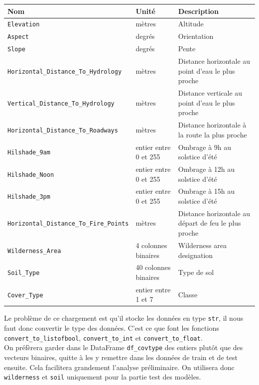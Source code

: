 \documentclass[12pt,a4paper]{article}
\numberwithin{equation}{section}
\newcommand{\elevation}{\texttt{Elevation}}
\newcommand{\aspect}{\texttt{Aspect}}
\newcommand{\slope}{\texttt{Slope}}
\newcommand{\hhydro}{\texttt{Horizontal\_Distance\_To\_Hydrology}}
\newcommand{\vhydro}{\texttt{Vertical\_Distance\_To\_Hydrology}}
\newcommand{\roadways}{\texttt{Horizontal\_Distance\_To\_Roadways}}
\newcommand{\hilshadeM}{\texttt{Hilshade\_9am}}
\newcommand{\hilshadeN}{\texttt{Hilshade\_Noon}}
\newcommand{\hilshadeA}{\texttt{Hilshade\_3pm}}
\newcommand{\wilderness}{\texttt{Wilderness\_Area}}
\newcommand{\soil}{\texttt{Soil\_Type}}
\newcommand{\cover}{\texttt{Cover\_Type}}
\begin{document}
	\begin{flushleft}
		\begin{tabular}{l l p{5.2cm}}
			Nom & Unité & Description \\
			\hline
			\elevation & mètres & Altitude \\ 
			\aspect & degrés & Orientation \\ 
			\slope & degrés & Pente \\
			\hhydro & mètres & Distance horizontale au point d’eau le plus proche\\
			\vhydro & mètres & Distance verticale au point d’eau le plus proche \\
			\roadways & mètres & Distance horizontale à la route la plus proche \\
			\hilshadeM & entier entre 0 et 255 & Ombrage à 9h au solstice d’été \\
			\hilshadeN & entier entre 0 et 255 & Ombrage à 12h au solstice d'été\\
			\hilshadeA & entier entre 0 et 255 &  Ombrage à 15h au solstice d'été \\
			\verb!Horizontal_Distance_To_Fire_Points! & mètres & Distance horizontale au départ de feu le plus proche\\
			\wilderness & 4 colonnes binaires & Wilderness area designation \\
			\soil & 40 colonnes binaires & Type de sol\\
			\cover & entier entre 1 et 7 & Classe\\
		\end{tabular}
	\end{flushleft}

	Le problème de ce chargement est qu'il stocke les données en type \verb!str!, il nous faut donc convertir le type des données. C'est ce que font les fonctions \verb!convert_to_listofbool!, \verb!convert_to_int! et \verb!convert_to_float!. \\
	
	On préfèrera garder dans le DataFrame \verb!df_covtype! des entiers plutôt que des vecteurs binaires, quitte à les y remettre dans les données de train et de test ensuite. Cela facilitera grandement l'analyse préliminaire. On utilisera donc \verb!wilderness! et \verb!soil! uniquement pour la partie test des modèles.\\
	
\end{document}

